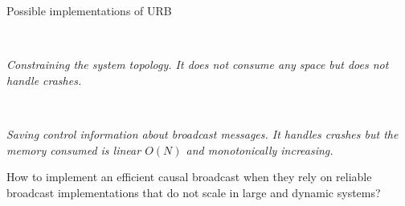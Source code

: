 \documentclass[10pt, xcolor={usenames, dvipsnames}]{beamer}
\newcommand{\cmark}{\ding{51}}
\newcommand{\xmark}{\ding{55}}
\newcommand{\YES}[1]{\textcolor{green}{#1}}
\newcommand{\NO}[1]{\textcolor{red}{#1}}
\begin{document}
\begin{frame}{Possible implementations of URB}
  
  \begin{minipage}{0.49\textwidth}
      
  \end{minipage}~
  \begin{minipage}{0.49\textwidth}
    \begin{center}
      
    \end{center}
  \end{minipage}
  \begin{minipage}{0.49\textwidth}
    \vspace{1em} 
    \begin{center}
      \small\textit{Constraining the system topology. It does not
        consume any space but does not handle crashes.}
    \end{center}
  \end{minipage}~
  \begin{minipage}{0.49\textwidth}
    \vspace{1em}
    \begin{center}
      \small\textit{Saving control information about broadcast
        messages. It handles crashes but the memory consumed is linear $O(N)$
        and monotonically increasing.}
    \end{center}
  \end{minipage}

  \begin{center}
    
  \end{center}
  
\end{frame}

\begin{frame}[standout]
  
  \vspace{1em}

  How to implement an efficient causal broadcast when they rely on reliable
  broadcast implementations that do not scale in large and dynamic systems?
    
  \vspace{1em}

  \begin{center}
    
  \end{center}
  

\end{frame}
\end{document}
